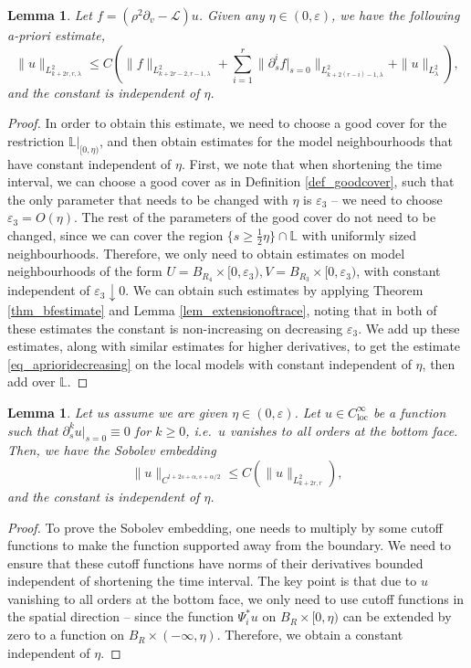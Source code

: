 \documentclass[10pt, a4paper]{article}
\theoremstyle{plain}%
\newtheorem{lem}[theorem]{Lemma}
\theoremstyle{definition}
\numberwithin{figure}{section}
\numberwithin{equation}{section}
\newcommand{\bL}{\mathbb{L}}
\newcommand{\pa}{\partial}
\newcommand{\ep}{\varepsilon}
\newcommand{\cL}{\mathcal{L}}
\newcommand{\loc}{\mathrm{loc}}
\begin{document}
\begin{lem}\label{lem_apriorishort}
	Let $f = (\rho^2\pa_v-\cL)u$. Given any $\eta \in (0,\ep)$, 
	we have the following a-priori estimate, 
	\begin{equation}\label{eq_aprioridecreasing}
	\|u\|_{L^2_{k+2r,r,\lambda}}\leq C\left(\|f\|_{L^2_{k+2r-2,r-1,\lambda}}+\sum_{i=1}^{r} \|\pa^i_sf|_{s=0}\|_{L^2_{k+2(r-i)-1,\lambda}}+\|u\|_{L^2_\lambda}\right),
	\end{equation}  and the constant is independent of $\eta$. 
\end{lem}
\begin{proof}
	In order to obtain this estimate, we need to choose a good cover for the restriction $\bL|_{[0,\eta)}$, and then obtain estimates for the model neighbourhoods that have constant independent of $\eta$. First, we note that when shortening the time interval, we can choose a good cover as in Definition \ref{def_goodcover}, such that the only parameter that needs to be changed with $\eta$ is $\ep_3$ -- we need to choose $\ep_3 = O(\eta)$. The rest of the parameters of the good cover do not need to be changed, since we can cover the region $\{s\geq \frac{1}{2}\eta\}\cap \bL$ with uniformly sized neighbourhoods. Therefore, we only need to obtain estimates on model neighbourhoods of the form $U=B_{R_4}\times [0,\ep_3), V = B_{R_3}\times[0,\ep_3)$, with constant independent of $\ep_3 \downarrow 0$. We can obtain such estimates by applying Theorem \ref{thm_bfestimate} and Lemma \ref{lem_extensionoftrace}, noting that in both of these estimates the constant is non-increasing on decreasing $\ep_3$. We add up these estimates, along with similar estimates for higher derivatives, to get the estimate \eqref{eq_aprioridecreasing} on the local models with constant independent of $\eta$, then add over $\bL$.
\end{proof}

\begin{lem}\label{prop_sobolevtime}
	Let us assume we are given $\eta \in (0,\ep)$. Let $u\in C^\infty_\loc$ be a function such that $\pa_s^ku|_{s=0} \equiv 0$ for $k\geq 0$, i.e.\ $u$ vanishes to all orders at the bottom face. Then,  we have the Sobolev embedding \[
	\|u\|_{C^{l+2s+\alpha,s+\alpha/2}} \leq  C (\|u\|_{L^{2}_{k+2r,r}}),
	\]
	and the constant is independent of $\eta$.
\end{lem}
\begin{proof}
	To prove the Sobolev embedding, one needs to multiply by some cutoff functions to make the function supported away from the boundary. We need to ensure that these cutoff functions have norms of their derivatives bounded independent of shortening the time interval. The key point is that due to $u$ vanishing to all orders at the bottom face, we only need to use cutoff functions in the spatial direction -- since the function $\Psi_i^*u$ on $B_R\times [0,\eta)$ can be extended by zero to a function on $B_R\times (-\infty, \eta)$. Therefore, we obtain a constant independent of $\eta$.
\end{proof}
\end{document}
